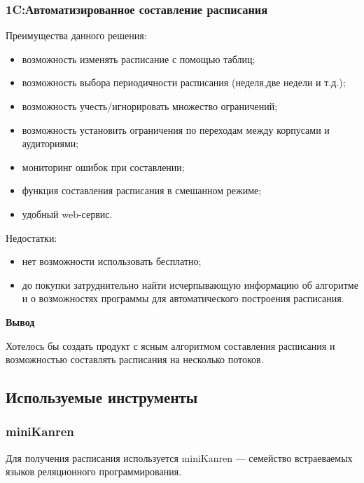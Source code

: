   \subsubsection{1C:Автоматизированное составление расписания}
    Преимущества данного решения:
  \begin{itemize}
    \item возможность изменять расписание с помощью таблиц;
    \item возможность выбора периодичности расписания (неделя,две недели и т.д.);
    \item возможность учесть/игнорировать множество ограничений;
    \item возможность установить ограничения по переходам между корпусами и аудиториями;
    \item мониторинг ошибок при составлении;
    \item функция составления расписания в смешанном режиме;
    \item удобный web-сервис.
  \end{itemize}
  Недостатки:
  \begin{itemize}
      \item нет возможности использовать бесплатно;
      \item до покупки затруднительно найти исчерпывающую информацию об алгоритме и о возможностях программы для автоматического построения расписания.
  \end{itemize}

\textbf{Вывод}

Хотелось бы создать продукт с ясным алгоритмом составления расписания и возможностью составлять расписания на несколько потоков.
\subsection{Используемые инструменты}
\subsubsection{miniKanren} 
Для получения расписания используется miniKanren --- семейство встраеваемых языков реляционного программирования. 


